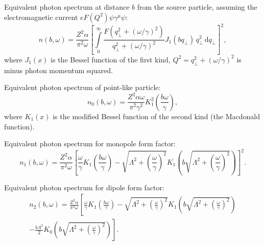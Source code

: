 \documentclass[a4paper,12pt]{article}
\begin{document}
Equivalent photon spectrum at distance $b$ from the source particle, assuming
the electromagnetic current $e F(Q^2) \psi \gamma^\mu \psi$:
\begin{equation}
  n(b, \omega)
  = \frac{Z^2 \alpha}{\pi^2 \omega}
    \left[
      \int\limits_0^\infty
        \frac{F(q_\perp^2 + (\omega / \gamma)^2)}
             {q_\perp^2 + (\omega / \gamma)^2}
        J_1(b q_\perp)
        \, q_\perp^2
        \, \mathrm{d} q_\perp
    \right]^2,
\end{equation}
where $J_1(x)$ is the Bessel function of the first kind, $Q^2 = q_\perp^2 +
(\omega / \gamma)^2$ is minus photon momentum squared.

Equivalent photon spectrum of point-like particle:
\begin{equation}
  n_0(b, \omega)
  = \frac{Z^2 \alpha \omega}{\pi^2 \gamma^2}
    K_1^2 \left( \frac{b \omega}{\gamma} \right),
\end{equation}
where $K_1(x)$ is the modified Bessel function of the second kind (the Macdonald
function).

Equivalent photon spectrum for monopole form factor:
\begin{equation}
  n_1(b, \omega)
  = \frac{Z^2 \alpha}{\pi^2 \omega}
    \left[
        \frac{\omega}{\gamma} K_1 \left( \frac{b \omega}{\gamma} \right)
      - \sqrt{\Lambda^2 + \left( \frac{\omega}{\gamma} \right)^2}
        K_1 \left(
          b \sqrt{\Lambda^2 + \left( \frac{\omega}{\gamma} \right)^2}
        \right)
    \right]^2.
\end{equation}

Equivalent photon spectrum for dipole form factor:
\begin{multline}
  n_2(b, \omega)
  = \frac{Z^2 \alpha}{\pi^2 \omega}
    \left[
        \frac{\omega}{\gamma} K_1 \left( \frac{b \omega}{\gamma} \right)
      - \sqrt{\Lambda^2 + \left( \frac{\omega}{\gamma} \right)^2}
        K_1 \left(
          b \sqrt{\Lambda^2 + \left( \frac{\omega}{\gamma} \right)^2}
        \right)
  \right. \\ \left.
      - \frac{b \Lambda^2}{2}
        K_0 \left(
          b \sqrt{\Lambda^2 + \left( \frac{\omega}{\gamma} \right)^2}
        \right)
    \right].
\end{multline}
\end{document}
